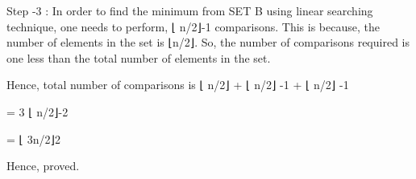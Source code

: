 \documentclass[letterpaper,portrait,12pt]{article}
\begin{document}
\begin{flushleft}

\end{flushleft}


\begin{flushleft}
Step -3 :  In order to find the minimum from SET B using linear searching technique, one needs to perform, ⌊ n/2⌋-1 comparisons. This is because, the number of elements in the set is ⌊n/2⌋. So, the number of comparisons required is one less than the total number of elements in the set.
\end{flushleft}


\begin{flushleft}

\end{flushleft}


\begin{flushleft}
Hence, total number of comparisons is  ⌊ n/2⌋ +  ⌊ n/2⌋ -1 +  ⌊ n/2⌋ -1 
\end{flushleft}


\begin{flushleft}
= 3 ⌊ n/2⌋-2
\end{flushleft}


\begin{flushleft}
= ⌊ 3n/2⌋2
\end{flushleft}


\begin{flushleft}
 
\end{flushleft}


\begin{flushleft}
Hence, proved.
\end{flushleft}


\begin{flushleft}

\end{flushleft}


\begin{flushleft}

\end{flushleft}


\begin{flushleft}
 
\end{flushleft}


\begin{flushleft}

\end{flushleft}


\begin{flushleft}

\end{flushleft}
\end{document}
